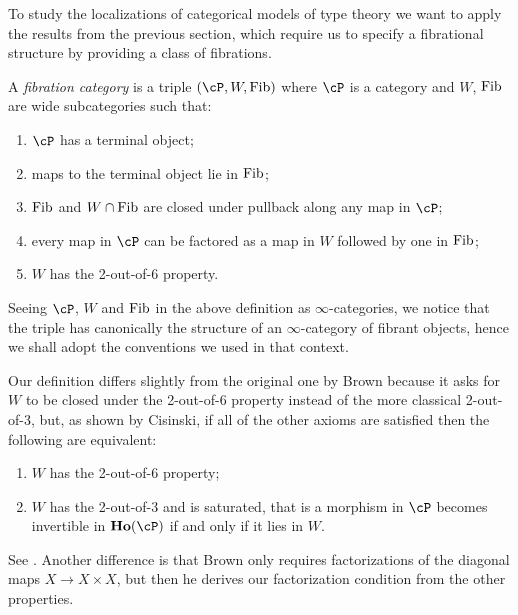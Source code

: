 To study the localizations of categorical models of type theory we want to apply
the results from the previous section, which require us to specify a
fibrational structure by providing a class
of fibrations.

\begin{defn}
  A \emph{fibration category} is a triple $(\cP,W,\fib)$ where $\cP$ is a
  category and $W$, $\operatorname{Fib}$ are wide subcategories such that:
  \begin{enumerate}
    \item $\cP$ has a terminal object;
    \item maps to the terminal object lie in $\operatorname{Fib}$;
    \item $\operatorname{Fib}$ and $W\cap \operatorname{Fib}$ are closed under pullback along any map in $\cP$;
    \item every map in $\cP$ can be factored as a map in $W$ followed by one in
      $\operatorname{Fib}$;
    \item $W$ has the 2-out-of-6 property.
  \end{enumerate}
\end{defn}

\begin{rmk}
  Seeing $\cP$, $W$ and $\operatorname{Fib}$ in the above definition as $\infty$-categories, we
  notice that the triple has canonically the structure of an $\infty$-category
  of fibrant objects, hence we shall adopt the conventions we used in that
  context.
\end{rmk}

\begin{rmk}
  Our definition differs slightly from the original one by Brown
  because it asks for $W$ to be closed under the 2-out-of-6 property
  instead of the more classical 2-out-of-3, but, as shown by
  Cisinski, if all of
  the other axioms are satisfied then the following are equivalent:
  \begin{enumerate}
    \item $W$ has the 2-out-of-6 property;
    \item $W$ has the 2-out-of-3 and is saturated, that is a morphism in $\cP$
      becomes invertible in $\ho(\cP)$ if and only if it lies in $W$.
  \end{enumerate}
  See \cite[Thm.~7.2.7]{RB06}. Another difference is that Brown only requires
  factorizations of the diagonal maps $X\rightarrow X\times X$, but then he
  derives our factorization condition from the other properties.
\end{rmk}

